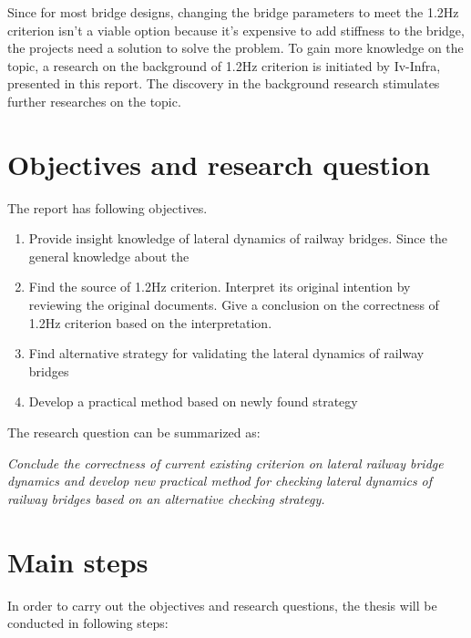 Since for most bridge designs, changing the bridge parameters to meet the 1.2Hz criterion isn't a viable option because it's expensive to add stiffness to the bridge, the projects need a solution to solve the problem. To gain more knowledge on the topic, a research on the background of 1.2Hz criterion is initiated by Iv-Infra, presented in this report. The discovery in the background research stimulates further researches on the topic. 

\section{Objectives and research question}\label{sec:introduction}


The report has following objectives.

\begin{enumerate}[-]
\item Provide insight knowledge of lateral dynamics of railway bridges. Since the general knowledge about the 


\item Find the source of 1.2Hz criterion. Interpret its original intention by reviewing the original documents. Give a conclusion on the correctness of 1.2Hz criterion based on the interpretation.
\item Find alternative strategy for validating the lateral dynamics of railway bridges
\item Develop a practical method based on newly found strategy 
\end{enumerate}

\vspace*{0.5cm}

The research question can be summarized as:

\textit{Conclude the correctness of current existing criterion on lateral railway bridge dynamics and develop new practical method for checking lateral dynamics of railway bridges based on an alternative checking strategy. }


\section{Main steps}

In order to carry out the objectives and research questions, the thesis will be conducted in following steps:


